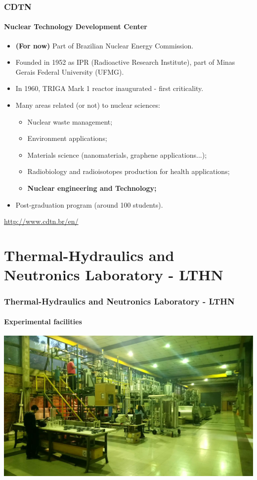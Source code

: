 \documentclass[svgnames,smaller,table]{beamer}
\begin{document}
\begin{frame}
  \frametitle{CDTN}
  \framesubtitle{Nuclear Technology Development Center}
  \begin{itemize}
    \item \textbf{(For now)} Part of Brazilian Nuclear Energy Commission.
  \item Founded in 1952 as IPR (Radioactive Research Institute), part of
    Minas Gerais Federal University (UFMG).
  \item In 1960, TRIGA Mark 1 reactor inaugurated - first criticality.
  \item Many areas related (or not) to nuclear sciences:
    \begin{itemize}
    \item Nuclear waste management;
    \item Environment applications;
    \item Materials science (nanomaterials, graphene applications...);
    \item Radiobiology and radioisotopes production for health applications;
    \item \textbf{Nuclear engineering and Technology;}
    \end{itemize}
  \item Post-graduation program (around 100 students).
  \end{itemize}
  \begin{center}
    \url{http://www.cdtn.br/en/}
    \end{center}
\end{frame}


\section{Thermal-Hydraulics and Neutronics Laboratory - LTHN}
\begin{frame}
  \frametitle{Thermal-Hydraulics and Neutronics Laboratory - LTHN}
  \framesubtitle{Experimental facilities}
  \begin{center}
    \includegraphics[scale=0.2]{figuras/labth.jpg}
  \end{center}
\end{frame}
\end{document}
